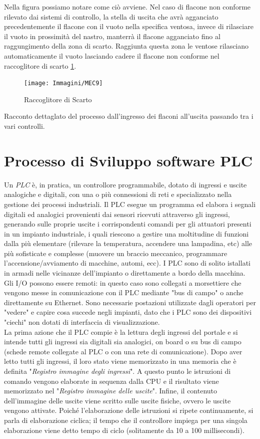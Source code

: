 \documentclass[12pt, a4paper, oneside]{book}
\begin{document}
Nella figura possiamo notare come ciò avviene. Nel caso di flacone non conforme rilevato dai sistemi di controllo, la stella di uscita che avrà agganciato precedentemente il flacone con il vuoto nella specifica ventosa, invece di rilasciare il vuoto in prossimità del nastro, manterrà il flacone agganciato fino al raggungimento della zona di scarto. Raggiunta questa zona le ventose rilasciano automaticamente il vuoto lasciando cadere il flacone non conforme nel raccoglitore di scarto \ref{mec9}. 

\begin{figure}[H]
	\centering
	\texttt{[image: Immagini/MEC9]}
	\label{mec9}
	\caption{ Raccoglitore di Scarto}
\end{figure}
 
Racconto dettaglato del processo dall'ingresso dei flaconi all'uscita passando tra i vari controlli.
\chapter{Processo di Sviluppo software PLC}
Un \textit{PLC} è, in pratica, un controllore programmabile, dotato di ingressi e uscite analogiche e digitali, con una o più connessioni di reti e specializzato nella gestione dei processi industriali. Il PLC esegue un programma ed elabora i segnali digitali ed analogici provenienti dai sensori ricevuti attraverso gli ingressi, generando sulle proprie uscite i corrispondenti comandi per gli attuatori presenti in un impianto industriale, i quali riescono a gestire una moltitudine di funzioni dalla più elementare (rilevare la temperatura, accendere una lampadina, etc) alle più sofisticate e complesse (muovere un braccio meccanico, programmare l’accensione/avviamento di macchine, automi, ecc). 
I PLC sono di solito istallati in armadi nelle vicinanze dell'impianto o direttamente a bordo della macchina. Gli I/O possono essere remoti: in questo caso sono collegati a morsettiere che vengono messe in comunicazione con il PLC mediante "bus di campo" o anche direttamente su Ethernet. Sono necessarie postazioni utilizzate dagli operatori per "vedere" e capire cosa succede negli impianti, dato che i PLC sono dei dispositivi "ciechi" non dotati di interfaccia di visualizzazione.
\\La prima azione che il PLC compie è la lettura degli ingressi del portale e si intende tutti gli ingressi sia digitali sia analogici, on board o su bus di campo (schede remote collegate al PLC o con una rete di comunicazione). Dopo aver letto tutti gli ingressi, il loro stato viene memorizzato in una memoria che è definita "\textit{Registro immagine degli ingressi}". A questo punto le istruzioni di comando vengono elaborate in sequenza dalla CPU e il risultato viene memorizzato nel "\textit{Registro immagine delle uscite}". Infine, il contenuto dell'immagine delle uscite viene scritto sulle uscite fisiche, ovvero le uscite vengono attivate. Poiché l'elaborazione delle istruzioni si ripete continuamente, si parla di elaborazione ciclica; il tempo che il controllore impiega per una singola elaborazione viene detto tempo di ciclo (solitamente da 10 a 100 millisecondi).
\end{document}
